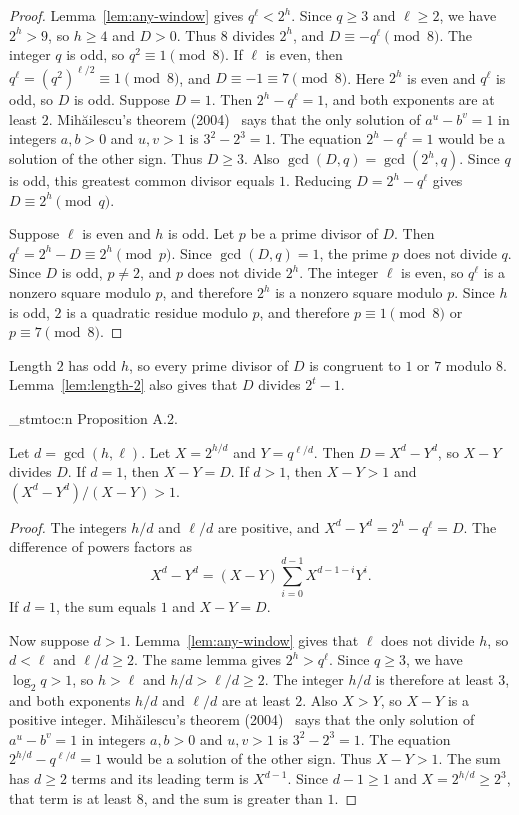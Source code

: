 \documentclass[11pt]{article}
\newenvironment{named}[1]{%
  \par\addvspace{\medskipamount}%
  \pagebreak[3]%
  \noindent{\bfseries #1}\space\ignorespaces
  \stmtoc{#1}%
}{\par\addvspace{\medskipamount}}
\newcommand{\stmtoc}[1]{ \qn_stmtoc:n {#1} }
\begin{document}
\begin{proof}
Lemma~\ref{lem:any-window} gives $q^\ell < 2^h$.
Since $q \ge 3$ and $\ell \ge 2$, we have $2^h > 9$, so $h \ge 4$ and $D > 0$.
Thus $8$ divides $2^h$, and $D \equiv -q^\ell \pmod{8}$.
The integer $q$ is odd, so $q^2 \equiv 1 \pmod{8}$.
If $\ell$ is even, then $q^\ell = (q^2)^{\ell/2} \equiv 1 \pmod{8}$, and $D \equiv -1 \equiv 7 \pmod{8}$.
Here $2^h$ is even and $q^\ell$ is odd, so $D$ is odd.
Suppose $D = 1$.
Then $2^h - q^\ell = 1$, and both exponents are at least $2$.
Mihăilescu's theorem (2004)~\cite{mihailescu} says that the only solution of $a^u - b^v = 1$ in integers $a, b > 0$ and $u, v > 1$ is $3^2 - 2^3 = 1$.
The equation $2^h - q^\ell = 1$ would be a solution of the other sign.
Thus $D \ge 3$.
Also $\gcd(D, q) = \gcd(2^h, q)$.
Since $q$ is odd, this greatest common divisor equals $1$.
Reducing $D = 2^h - q^\ell$ gives $D \equiv 2^h \pmod{q}$.

Suppose $\ell$ is even and $h$ is odd.
Let $p$ be a prime divisor of $D$.
Then $q^\ell = 2^h - D \equiv 2^h \pmod{p}$.
Since $\gcd(D, q) = 1$, the prime $p$ does not divide $q$.
Since $D$ is odd, $p \ne 2$, and $p$ does not divide $2^h$.
The integer $\ell$ is even, so $q^\ell$ is a nonzero square modulo $p$, and therefore $2^h$ is a nonzero square modulo $p$.
Since $h$ is odd, $2$ is a quadratic residue modulo $p$, and therefore $p \equiv 1 \pmod{8}$ or $p \equiv 7 \pmod{8}$.
\end{proof}

Length $2$ has odd $h$, so every prime divisor of $D$ is congruent to $1$ or $7$ modulo $8$.
Lemma~\ref{lem:length-2} also gives that $D$ divides $2^t - 1$.

\begin{named}{Proposition A.2.}
Let $d = \gcd(h, \ell)$.
Let $X = 2^{h/d}$ and $Y = q^{\ell/d}$.
Then $D = X^d - Y^d$, so $X - Y$ divides $D$.
If $d = 1$, then $X - Y = D$.
If $d > 1$, then $X - Y > 1$ and $(X^d - Y^d)/(X - Y) > 1$.
\end{named}

\begin{proof}
The integers $h/d$ and $\ell/d$ are positive, and $X^d - Y^d = 2^h - q^\ell = D$.
The difference of powers factors as
\[
X^d - Y^d = (X - Y) \sum_{i=0}^{d-1} X^{d-1-i} Y^i.
\]
If $d = 1$, the sum equals $1$ and $X - Y = D$.

Now suppose $d > 1$.
Lemma~\ref{lem:any-window} gives that $\ell$ does not divide $h$, so $d < \ell$ and $\ell/d \ge 2$.
The same lemma gives $2^h > q^\ell$.
Since $q \ge 3$, we have $\log_2 q > 1$, so $h > \ell$ and $h/d > \ell/d \ge 2$.
The integer $h/d$ is therefore at least $3$, and both exponents $h/d$ and $\ell/d$ are at least $2$.
Also $X > Y$, so $X - Y$ is a positive integer.
Mihăilescu's theorem (2004)~\cite{mihailescu} says that the only solution of $a^u - b^v = 1$ in integers $a, b > 0$ and $u, v > 1$ is $3^2 - 2^3 = 1$.
The equation $2^{h/d} - q^{\ell/d} = 1$ would be a solution of the other sign.
Thus $X - Y > 1$.
The sum has $d \ge 2$ terms and its leading term is $X^{d-1}$.
Since $d - 1 \ge 1$ and $X = 2^{h/d} \ge 2^3$, that term is at least $8$, and the sum is greater than $1$.
\end{proof}
\end{document}
